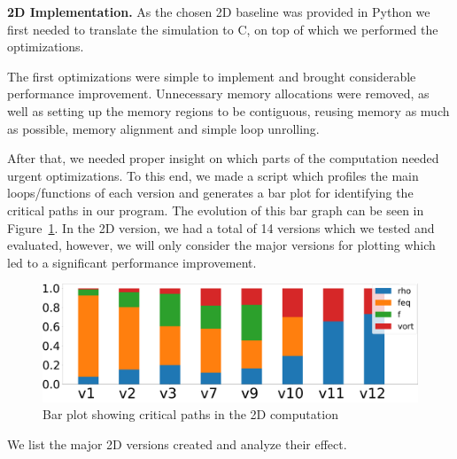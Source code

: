 \documentclass[letterpaper]{article}
\newcommand{\mypar}[1]{{\bf #1.}}
\begin{document}
\mypar{2D Implementation} As the chosen 2D baseline was provided in Python we first needed to translate the simulation to C, on top of which we performed the optimizations.

The first optimizations were simple to implement and brought considerable performance improvement. Unnecessary memory allocations were removed, as well as setting up the memory regions to be contiguous, reusing memory as much as possible, memory alignment and simple loop unrolling.

After that, we needed proper insight on which parts of the computation needed urgent optimizations. To this end, we made a script which profiles the main loops/functions of each version and generates a bar plot for identifying the critical paths in our program. The evolution of this bar graph can be seen in Figure~\ref{fig:2D_bar}. In the 2D version, we had a total of 14 versions which we tested and evaluated, however, we will only consider the major versions for plotting which led to a significant performance improvement.

\begin{figure}[h!]
    \includegraphics[width=\linewidth]{fig/2D_artifacts/bar_plot_report.out.pdf}
    \caption{Bar plot showing critical paths in the 2D computation}
    \label{fig:2D_bar}
\end{figure}

We list the major 2D versions created and analyze their effect.
\end{document}
